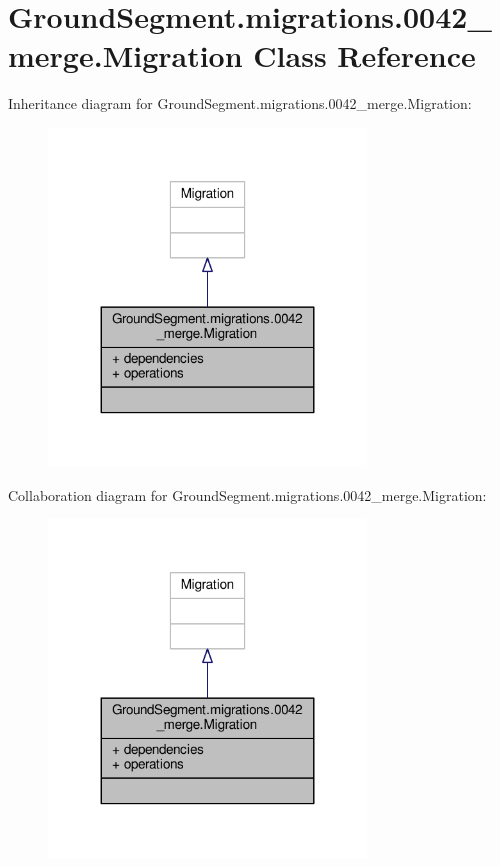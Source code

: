 \hypertarget{class_ground_segment_1_1migrations_1_10042__merge_1_1_migration}{}\section{Ground\+Segment.\+migrations.0042\+\_\+merge.Migration Class Reference}
\label{class_ground_segment_1_1migrations_1_10042__merge_1_1_migration}


Inheritance diagram for Ground\+Segment.\+migrations.0042\+\_\+merge.Migration\+:\nopagebreak
\begin{figure}[H]
\begin{center}
\leavevmode
\includegraphics[width=239pt]{class_ground_segment_1_1migrations_1_10042__merge_1_1_migration__inherit__graph}
\end{center}
\end{figure}


Collaboration diagram for Ground\+Segment.\+migrations.0042\+\_\+merge.Migration\+:\nopagebreak
\begin{figure}[H]
\begin{center}
\leavevmode
\includegraphics[width=239pt]{class_ground_segment_1_1migrations_1_10042__merge_1_1_migration__coll__graph}
\end{center}
\end{figure}
